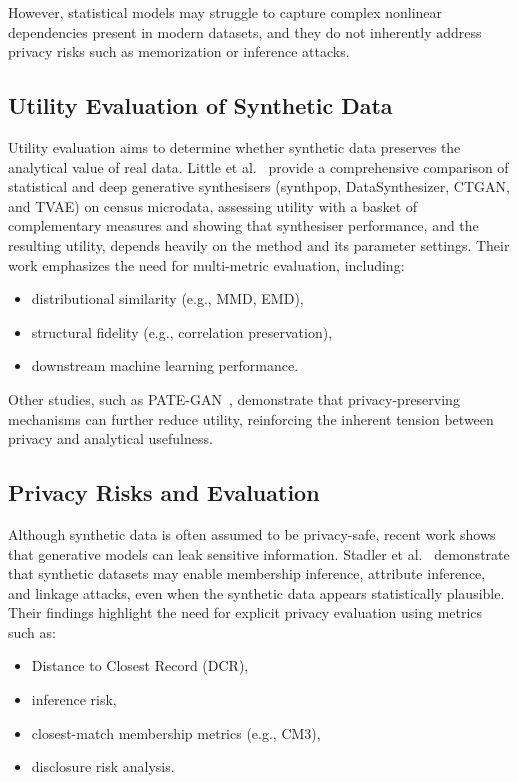 \documentclass[11pt]{article}
\begin{document}
However, statistical models may struggle to capture complex nonlinear dependencies present in modern datasets, and they do not inherently address privacy risks such as memorization or inference attacks.

\subsection{Utility Evaluation of Synthetic Data}

Utility evaluation aims to determine whether synthetic data preserves the analytical value of real data. Little et al.~\cite{little2025synthetic} provide a comprehensive comparison of statistical and deep generative synthesisers (synthpop, DataSynthesizer, CTGAN, and TVAE) on census microdata, assessing utility with a basket of complementary measures and showing that synthesiser performance, and the resulting utility, depends heavily on the method and its parameter settings. Their work emphasizes the need for multi-metric evaluation, including:

\begin{itemize}
    \item distributional similarity (e.g., MMD, EMD),
    \item structural fidelity (e.g., correlation preservation),
    \item downstream machine learning performance.
\end{itemize}

Other studies, such as PATE-GAN~\cite{jordon2018pategan}, demonstrate that privacy-preserving mechanisms can further reduce utility, reinforcing the inherent tension between privacy and analytical usefulness.

\subsection{Privacy Risks and Evaluation}

Although synthetic data is often assumed to be privacy-safe, recent work shows that generative models can leak sensitive information. Stadler et al.~\cite{stadler2022synthetic} demonstrate that synthetic datasets may enable membership inference, attribute inference, and linkage attacks, even when the synthetic data appears statistically plausible. Their findings highlight the need for explicit privacy evaluation using metrics such as:

\begin{itemize}
    \item Distance to Closest Record (DCR),
    \item inference risk,
    \item closest-match membership metrics (e.g., CM3),
    \item disclosure risk analysis.
\end{itemize}
\end{document}
